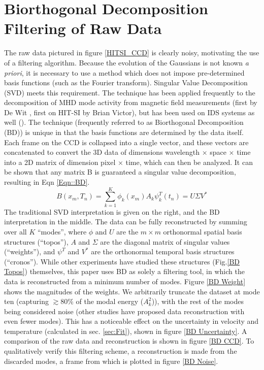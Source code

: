 \documentclass{AIAA}
\begin{document}

\section{Biorthogonal Decomposition Filtering of Raw Data}\label{sec::BD}
\hspace{4ex}The raw data pictured in figure \ref{HITSI_CCD} is clearly noisy, motivating the use of a filtering algorithm. Because the evolution of the Gaussians is not known \textit{a priori}, it is necessary to use a method which does not impose pre-determined basis functions (such as the Fourier transform). Singular Value Decomposition (SVD) meets this requirement. The technique has been applied frequently to the decomposition of MHD mode activity from magnetic field measurements (first by De Wit \cite{de1994biorthogonal}, first on HIT-SI by Brian Victor\cite{BVictor}), but has been used on IDS systems as well (\cite{fenzi20012d}). The technique (frequently referred to as Biorthogonal Decomposition (BD)) is unique in that the basis functions are determined by the data itself. Each frame on the CCD is collapsed into a single vector, and these vectors are concatenated to convert the 3D data of dimensions wavelength $\times$ space $\times$ time into a 2D matrix of dimension pixel $\times$ time, which can then be analyzed. It can be shown\cite{kutz2013data} that any matrix B is guaranteed a singular value decomposition, resulting in Eqn \ref{Eqn::BD}.
\begin{equation}\label{Eqn::BD}
B(x_m,T_n)= \sum^K_{k=1}\phi_k(x_m)A_k\psi_k^T(t_n) = U\Sigma{V^*}
\end{equation}
The traditional SVD interpretation is given on the right, and the BD interpretation in the middle. The data can be fully reconstructed by summing over all $K$ ``modes'', where $\phi$ and $U$ are the $m\times{m}$ orthonormal spatial basis structures (``topos''), $A$ and $\Sigma$ are the diagonal matrix of singular values (``weights''), and $\psi^T$ and $V^*$ are the orthonormal temporal basis structures (``cronos''). While other experiments have studied these structures (Fig.\ref{BD Topos}) themselves\cite{fenzi20012d}, this paper uses BD as solely a filtering tool, in which the data is reconstructed from a minimum number of modes. Figure \ref{BD Weight} shows the magnitudes of the weights. We arbitrarily truncate the dataset at mode ten (capturing $\gtrsim80\%$ of the modal energy ($A_k^2$)\cite{de1994biorthogonal}), with the rest of the modes being considered noise (other studies have proposed data reconstruction with even fewer modes\cite{gavish2014optimal}). This has a noticeable effect on the uncertainty in velocity and temperature (calculated in sec. \ref{sec:Fit}), shown in figure \ref{BD Uncertainty}. A comparison of the raw data and reconstruction is shown in figure \ref{BD CCD}. To qualitatively verify this filtering scheme, a reconstruction is made from the discarded modes, a frame from which is plotted in figure \ref{BD Noise}.
\end{document}
